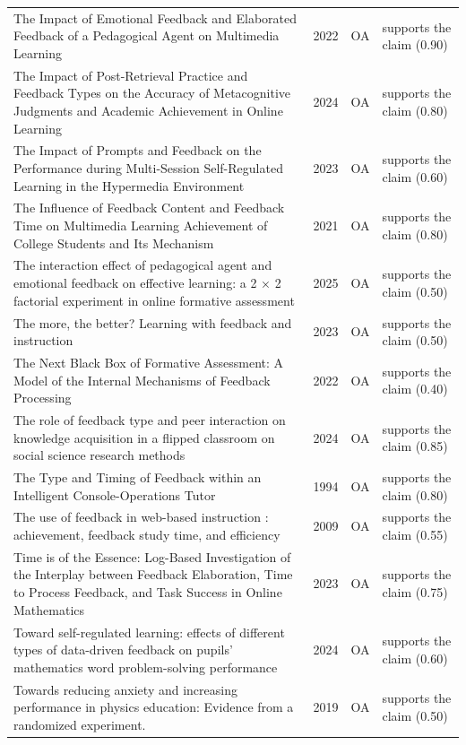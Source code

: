 \begin{longtable}{@{}%
  >{\raggedright\arraybackslash}p{}c%
  >{\raggedright\arraybackslash}p{}%
  >{\raggedright\arraybackslash}p{}@{}}
The Impact of Emotional Feedback and Elaborated Feedback of a Pedagogical Agent on Multimedia Learning & 2022 & OA & supports the claim (0.90) \\
The Impact of Post-Retrieval Practice and Feedback Types on the Accuracy of Metacognitive Judgments and Academic Achievement in Online Learning & 2024 & OA & supports the claim (0.80) \\
The Impact of Prompts and Feedback on the Performance during Multi-Session Self-Regulated Learning in the Hypermedia Environment & 2023 & OA & supports the claim (0.60) \\
The Influence of Feedback Content and Feedback Time on Multimedia Learning Achievement of College Students and Its Mechanism & 2021 & OA & supports the claim (0.80) \\
The interaction effect of pedagogical agent and emotional feedback on effective learning: a 2 × 2 factorial experiment in online formative assessment & 2025 & OA & supports the claim (0.50) \\
The more, the better? Learning with feedback and instruction & 2023 & OA & supports the claim (0.50) \\
The Next Black Box of Formative Assessment: A Model of the Internal Mechanisms of Feedback Processing & 2022 & OA & supports the claim (0.40) \\
The role of feedback type and peer interaction on knowledge acquisition in a flipped classroom on social science research methods & 2024 & OA & supports the claim (0.85) \\
The Type and Timing of Feedback within an Intelligent Console-Operations Tutor & 1994 & OA & supports the claim (0.80) \\
The use of feedback in web-based instruction : achievement, feedback study time, and efficiency & 2009 & OA & supports the claim (0.55) \\
Time is of the Essence: Log-Based Investigation of the Interplay between Feedback Elaboration, Time to Process Feedback, and Task Success in Online Mathematics & 2023 & OA & supports the claim (0.75) \\
Toward self-regulated learning: effects of different types of data-driven feedback on pupils' mathematics word problem-solving performance & 2024 & OA & supports the claim (0.60) \\
Towards reducing anxiety and increasing performance in physics education: Evidence from a randomized experiment. & 2019 & OA & supports the claim (0.50) \\

\end{longtable}
